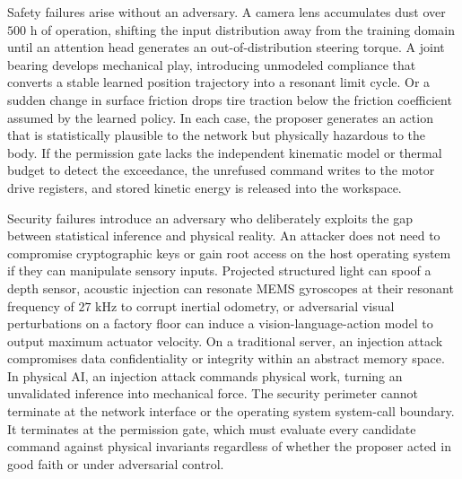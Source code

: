 \documentclass[
  10pt,
  letterpaper,
  twoside,
  openright,
  numbers=noenddot,
  headings=standardclasses
]{scrbook}
\begin{document}
Safety failures arise without an adversary. A camera lens accumulates
dust over \(500\text{ h}\) of operation, shifting the input distribution
away from the training domain until an attention head generates an
out-of-distribution steering torque. A joint bearing develops mechanical
play, introducing unmodeled compliance that converts a stable learned
position trajectory into a resonant limit cycle. Or a sudden change in
surface friction drops tire traction below the friction coefficient
assumed by the learned policy. In each case, the proposer generates an
action that is statistically plausible to the network but physically
hazardous to the body. If the permission gate lacks the independent
kinematic model or thermal budget to detect the exceedance, the
unrefused command writes to the motor drive registers, and stored
kinetic energy is released into the workspace.

Security failures introduce an adversary who deliberately exploits the
gap between statistical inference and physical reality. An attacker does
not need to compromise cryptographic keys or gain root access on the
host operating system if they can manipulate sensory inputs. Projected
structured light can spoof a depth sensor, acoustic injection can
resonate MEMS gyroscopes at their resonant frequency of
\(27\text{ kHz}\) to corrupt inertial odometry,
or adversarial visual perturbations on a factory floor can induce a
vision-language-action model to output maximum actuator velocity. On a
traditional server, an injection attack compromises data confidentiality
or integrity within an abstract memory space. In physical AI, an
injection attack commands physical work, turning an unvalidated
inference into mechanical force. The security perimeter cannot terminate
at the network interface or the operating system system-call boundary.
It terminates at the permission gate, which must evaluate every
candidate command against physical invariants regardless of whether the
proposer acted in good faith or under adversarial control.
\end{document}
